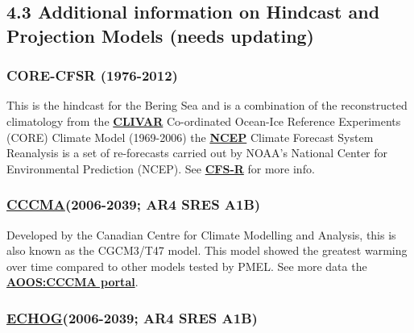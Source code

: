 \documentclass[
]{article}
\begin{document}
\hypertarget{additional-information-on-hindcast-and-projection-models-needs-updating}{%
\subsection{4.3 Additional information on Hindcast and Projection Models
(needs
updating)}\label{additional-information-on-hindcast-and-projection-models-needs-updating}}

\hypertarget{core-cfsr-1976-2012}{%
\subsubsection{CORE-CFSR (1976-2012)}\label{core-cfsr-1976-2012}}

This is the hindcast for the Bering Sea and is a combination of the
reconstructed climatology from the
\href{http://portal.aoos.org/bering-sea.php\#module-metadata/5626a0b6-7d79-11e3-ac17-00219bfe5678/0756e6c2-a8e2-40af-aa3d-22051ed68067}{\textbf{CLIVAR}}
Co-ordinated Ocean-Ice Reference Experiments (CORE) Climate Model
(1969-2006) the
\href{http://portal.aoos.org/bering-sea.php\#module-metadata/f8cb79f6-7d59-11e3-a6ee-00219bfe5678/2deb2eca-f3f5-4eda-a132-112468711de7}{\textbf{NCEP}}
Climate Forecast System Reanalysis is a set of re-forecasts carried out
by NOAA's National Center for Environmental Prediction (NCEP). See
\href{http://cfs.ncep.noaa.gov/cfsr/}{\textbf{CFS-R}} for more info.

\hypertarget{cccma2006-2039-ar4-sres-a1b}{%
\subsubsection{\texorpdfstring{\href{http://www.cccma.ec.gc.ca/diagnostics/cgcm3/cgcm3.shtml}{CCCMA}(2006-2039;
AR4 SRES
A1B)}{CCCMA(2006-2039; AR4 SRES A1B)}}\label{cccma2006-2039-ar4-sres-a1b}}

Developed by the Canadian Centre for Climate Modelling and Analysis,
this is also known as the CGCM3/T47 model. This model showed the
greatest warming over time compared to other models tested by PMEL. See
more data the
\href{http://portal.aoos.org/bering-sea.php\#module-metadata/4f706756-7d57-11e3-bce5-00219bfe5678/ffa1bcc1-288d-4f8e-912e-500a618b241a}{\textbf{AOOS:CCCMA
portal}}.

\hypertarget{echog2006-2039-ar4-sres-a1b}{%
\subsubsection{\texorpdfstring{\href{http://www-pcmdi.llnl.gov/ipcc/model_documentation/ECHO-G.pdf}{ECHOG}(2006-2039;
AR4 SRES
A1B)}{ECHOG(2006-2039; AR4 SRES A1B)}}\label{echog2006-2039-ar4-sres-a1b}}
\end{document}

